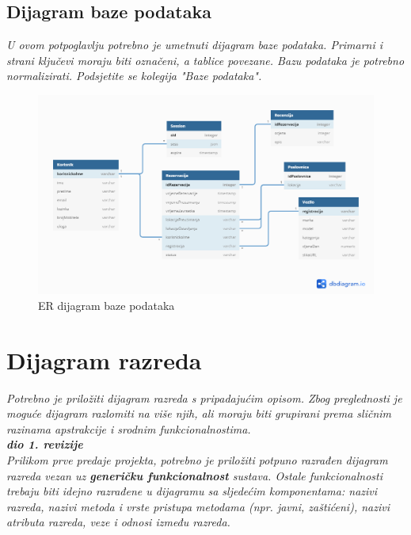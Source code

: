 			
			\newpage\subsection{Dijagram baze podataka}
				\textit{ U ovom potpoglavlju potrebno je umetnuti dijagram baze podataka. Primarni i strani ključevi moraju biti označeni, a tablice povezane. Bazu podataka je potrebno normalizirati. Podsjetite se kolegija "Baze podataka".}
			
			 \begin{figure}[hp]
                    \centering
                    \includegraphics[width=15cm]{slike/ER_dijagram.png}
                    \caption{ER dijagram baze podataka}
                    \label{fig:useCase-2}
                \end{figure}
			
			
		\section{Dijagram razreda}
		
			\textit{Potrebno je priložiti dijagram razreda s pripadajućim opisom. Zbog preglednosti je moguće dijagram razlomiti na više njih, ali moraju biti grupirani prema sličnim razinama apstrakcije i srodnim funkcionalnostima.}\\
			
			\textbf{\textit{dio 1. revizije}}\\
			
			\textit{Prilikom prve predaje projekta, potrebno je priložiti potpuno razrađen dijagram razreda vezan uz \textbf{generičku funkcionalnost} sustava. Ostale funkcionalnosti trebaju biti idejno razrađene u dijagramu sa sljedećim komponentama: nazivi razreda, nazivi metoda i vrste pristupa metodama (npr. javni, zaštićeni), nazivi atributa razreda, veze i odnosi između razreda.}\\
			
